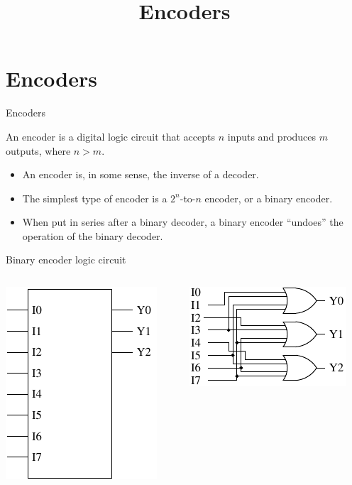 \title{Encoders}

\section{Encoders}

\begin{frame}{Encoders}
  \begin{definition}
    An \alert{encoder} is a digital logic circuit that accepts $n$ inputs and produces $m$ outputs, where $n>m$.
  \end{definition}
  \begin{itemize}
    \item An encoder is, in some sense, the inverse of a decoder.
    \item The simplest type of encoder is a $2^n$-to-$n$ encoder, or a \alert{binary encoder}.
    \item When put in series after a binary decoder, a binary encoder ``undoes'' the operation of the binary decoder.
  \end{itemize}
\end{frame}

\begin{frame}{Binary encoder logic circuit}
  \begin{columns}
    \begin{column}{5cm}
      \begin{center}
        \includegraphics{BinaryEncoderSchematic}
      \end{center}
    \end{column}
    \begin{column}{5cm}
      \begin{center}
        \includegraphics{BinaryEncoderLogic}
      \end{center}
    \end{column}
  \end{columns}
\end{frame}

